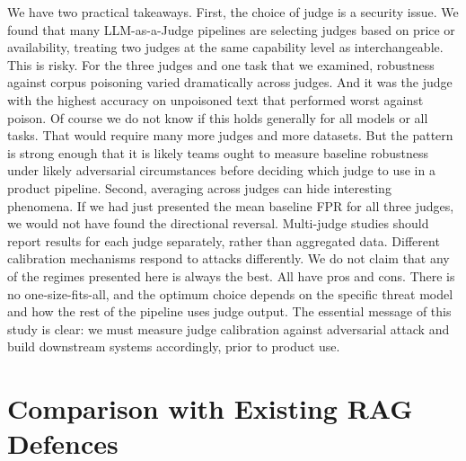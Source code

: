 We have two practical takeaways.
First, the choice of judge is a security issue. We found that many LLM-as-a-Judge pipelines are selecting judges based on price or availability, treating two judges at the same capability level as interchangeable. This is risky. For the three judges and one task that we examined, robustness against corpus poisoning varied dramatically across judges. And it was the judge with the highest accuracy on unpoisoned text that performed worst against poison. Of course we do not know if this holds generally for all models or all tasks. That would require many more judges and more datasets. But the pattern is strong enough that it is likely teams ought to measure baseline robustness under likely adversarial circumstances before deciding which judge to use in a product pipeline.
Second, averaging across judges can hide interesting phenomena. If we had just presented the mean baseline FPR for all three judges, we would not have found the directional reversal. Multi-judge studies should report results for each judge separately, rather than aggregated data. Different calibration mechanisms respond to attacks differently.
We do not claim that any of the regimes presented here is always the best. All have pros and cons. There is no one-size-fits-all, and the optimum choice depends on the specific threat model and how the rest of the pipeline uses judge output. The essential message of this study is clear: we must measure judge calibration against adversarial attack and build downstream systems accordingly, prior to product use.


\section{Comparison with Existing RAG Defences}

